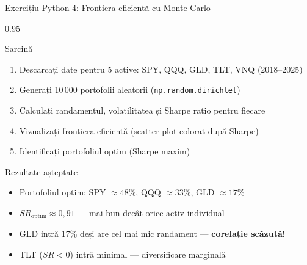 \documentclass[9pt, aspectratio=169, t]{beamer}
\begin{document}
\begin{frame}[shrink=10]{Exercițiu Python 4: Frontiera eficientă cu Monte Carlo}
\begin{cminipage}{0.95\textwidth}
    \begin{block}{Sarcină}
    \begin{enumerate}\setlength{\itemsep}{0pt}
        \item Descărcați date pentru 5 active: SPY, QQQ, GLD, TLT, VNQ (2018--2025)
        \item Generați 10\,000 portofolii aleatorii (\texttt{np.random.dirichlet})
        \item Calculați randamentul, volatilitatea și Sharpe ratio pentru fiecare
        \item Vizualizați frontiera eficientă (scatter plot colorat după Sharpe)
        \item Identificați portofoliul optim (Sharpe maxim)
    \end{enumerate}
    \end{block}

    \vspace{0.2cm}
    \begin{alertblock}{Rezultate așteptate}
    \begin{itemize}\setlength{\itemsep}{0pt}
        \item Portofoliul optim: SPY $\approx 48\%$, QQQ $\approx 33\%$, GLD $\approx 17\%$
        \item $SR_{\text{optim}} \approx 0{,}91$ --- mai bun decât orice activ individual
        \item GLD intră 17\% deși are cel mai mic randament --- \textbf{corelație scăzută}!
        \item TLT ($SR < 0$) intră minimal --- diversificare marginală
    \end{itemize}
    \end{alertblock}

\end{cminipage}
\end{frame}
\end{document}
